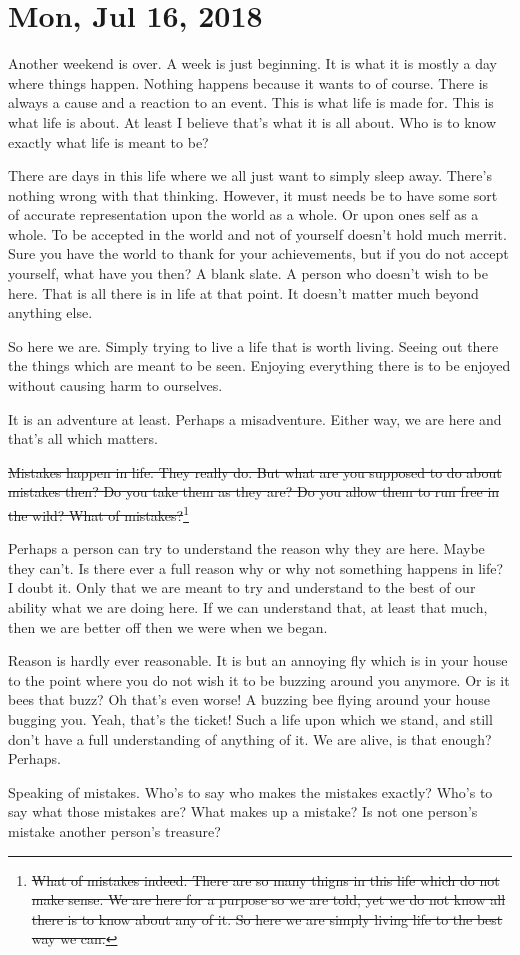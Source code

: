 \section{Mon, Jul 16, 2018}

Another weekend is over. A week is just beginning. It is what it is mostly a day
where things happen. Nothing happens because it wants to of course. There is
always a cause and a reaction to an event. This is what life is made for. This
is what life is about. At least I believe that's what it is all about. Who is to
know exactly what life is meant to be?

There are days in this life where we all just want to simply sleep away. There's
nothing wrong with that thinking. However, it must needs be to have some sort of
accurate representation upon the world as a whole. Or upon ones self as a whole.
To be accepted in the world and not of yourself doesn't hold much merrit. Sure
you have the world to thank for your achievements, but if you do not accept
yourself, what have you then? A blank slate. A person who doesn't wish to be
here. That is all there is in life at that point. It  doesn't matter much beyond
anything else.

So here we are. Simply trying to live a life that is worth living. Seeing out
there the things which are meant to be seen. Enjoying everything there is to be
enjoyed without causing harm to ourselves.

It is an adventure at least. Perhaps a misadventure. Either way, we are here and
that's all which matters.

\st{Mistakes happen in life. They really do. But what are you supposed to do
about mistakes then? Do you take them as they are? Do you allow them to run free
in the wild? What of mistakes?}\footnote{\st{What of mistakes indeed. There are so
many thigns in this life which do not make sense. We are here for a purpose
so we are told, yet we do not know all there is to know about any of it. So here
we are simply living life to the best way we can.}}

Perhaps a person can try to understand the reason why they are here. Maybe they
can't. Is there ever a full reason why or why not something happens in life? I
doubt it. Only that we are meant to try and understand to the best of our
ability what we are doing here. If we can understand that, at least that much,
then we are better off then we were when we began.

Reason is hardly ever reasonable. It is but an annoying fly which is in your
house to the point where you do not wish it to be buzzing around you anymore. Or
is it bees that buzz? Oh that's even worse! A buzzing bee flying around your
house bugging you. Yeah, that's the ticket! Such a life upon which we stand, and
still don't have a full understanding of anything of it. We are alive, is that
enough? Perhaps.

Speaking of mistakes. Who's to say who makes the mistakes exactly? Who's to say
what those mistakes are? What makes up a mistake? Is not one person's mistake
another person's treasure?